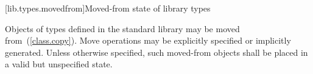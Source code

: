 [lib.types.movedfrom]{Moved-from state of library types}

\pnum
Objects of types defined in the \Cpp standard library may be moved
from~(\ref{class.copy}). Move operations may be explicitly specified or
implicitly generated. Unless otherwise specified, such moved-from objects shall
be placed in a valid but unspecified state.
